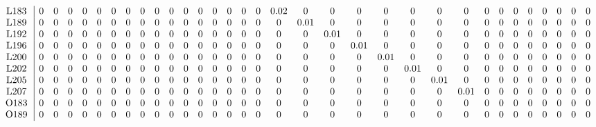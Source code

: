 \begin{table}[H]
\begin{center}
\begin{math}
\begin{array}{c|cccccccccccccccccccccccccccccccc}
\mathrm{L183} \hspace*{2pt} &  0 &  0 &  0 &  0 &  0 &  0 &  0 &  0 &  0 &  0 &  0 &  0 &  0 &  0 &  0 &  0 &       0.02 &  0 &  0 &  0 &  0 &  0 &  0 &  0 &  0 &  0 &  0 &  0 &  0 &  0 &  0 &  0 \\
\mathrm{L189} \hspace*{2pt} &  0 &  0 &  0 &  0 &  0 &  0 &  0 &  0 &  0 &  0 &  0 &  0 &  0 &  0 &  0 &  0 &  0 &       0.01 &  0 &  0 &  0 &  0 &  0 &  0 &  0 &  0 &  0 &  0 &  0 &  0 &  0 &  0 \\
\mathrm{L192} \hspace*{2pt} &  0 &  0 &  0 &  0 &  0 &  0 &  0 &  0 &  0 &  0 &  0 &  0 &  0 &  0 &  0 &  0 &  0 &  0 &       0.01 &  0 &  0 &  0 &  0 &  0 &  0 &  0 &  0 &  0 &  0 &  0 &  0 &  0 \\
\mathrm{L196} \hspace*{2pt} &  0 &  0 &  0 &  0 &  0 &  0 &  0 &  0 &  0 &  0 &  0 &  0 &  0 &  0 &  0 &  0 &  0 &  0 &  0 &       0.01 &  0 &  0 &  0 &  0 &  0 &  0 &  0 &  0 &  0 &  0 &  0 &  0 \\
\mathrm{L200} \hspace*{2pt} &  0 &  0 &  0 &  0 &  0 &  0 &  0 &  0 &  0 &  0 &  0 &  0 &  0 &  0 &  0 &  0 &  0 &  0 &  0 &  0 &       0.01 &  0 &  0 &  0 &  0 &  0 &  0 &  0 &  0 &  0 &  0 &  0 \\
\mathrm{L202} \hspace*{2pt} &  0 &  0 &  0 &  0 &  0 &  0 &  0 &  0 &  0 &  0 &  0 &  0 &  0 &  0 &  0 &  0 &  0 &  0 &  0 &  0 &  0 &       0.01 &  0 &  0 &  0 &  0 &  0 &  0 &  0 &  0 &  0 &  0 \\
\mathrm{L205} \hspace*{2pt} &  0 &  0 &  0 &  0 &  0 &  0 &  0 &  0 &  0 &  0 &  0 &  0 &  0 &  0 &  0 &  0 &  0 &  0 &  0 &  0 &  0 &  0 &       0.01 &  0 &  0 &  0 &  0 &  0 &  0 &  0 &  0 &  0 \\
\mathrm{L207} \hspace*{2pt} &  0 &  0 &  0 &  0 &  0 &  0 &  0 &  0 &  0 &  0 &  0 &  0 &  0 &  0 &  0 &  0 &  0 &  0 &  0 &  0 &  0 &  0 &  0 &       0.01 &  0 &  0 &  0 &  0 &  0 &  0 &  0 &  0 \\
\mathrm{O183} \hspace*{2pt} &  0 &  0 &  0 &  0 &  0 &  0 &  0 &  0 &  0 &  0 &  0 &  0 &  0 &  0 &  0 &  0 &  0 &  0 &  0 &  0 &  0 &  0 &  0 &  0 &  0 &  0 &  0 &  0 &  0 &  0 &  0 &  0 \\
\mathrm{O189} \hspace*{2pt} &  0 &  0 &  0 &  0 &  0 &  0 &  0 &  0 &  0 &  0 &  0 &  0 &  0 &  0 &  0 &  0 &  0 &  0 &  0 &  0 &  0 &  0 &  0 &  0 &  0 &  0 &  0 &  0 &  0 &  0 &  0 &  0 \\

\end{array}
\end{math}
\end{center}
\end{table}
